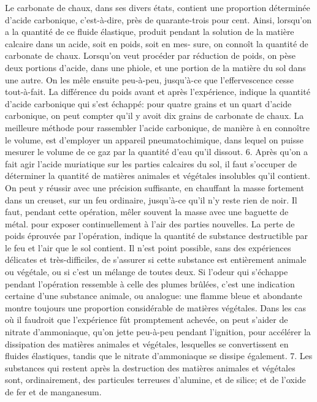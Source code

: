 Le carbonate de chaux, dans ses divers états, contient une proportion déterminée d'acide carbonique, c'est-à-dire, près de quarante-trois pour cent. Ainsi, lorsqu'on a la quantité de ce fluide élastique, produit pendant la solution de la matière calcaire dans un acide, soit en poids, soit en mes-\setcounter{page}{430} sure, on connoît la quantité de carbonate de chaux.
Lorsqu'on veut procéder par réduction de poids, on pèse deux portions d'acide, dans une phiole, et une portion de la matière du sol dans une autre. On les mêle ensuite peu-à-peu, jusqu'à-ce que l'effervescence cesse tout-à-fait. La différence du poids avant et après l'expérience, indique la quantité d'acide carbonique qui s'est échappé: pour quatre grains et un quart d'acide carbonique, on peut compter qu'il y avoit dix grains de carbonate de chaux. La meilleure méthode pour rassembler l'acide carbonique, de manière à en connoître le volume, est d'employer un appareil pneumatochimique, dans lequel on puisse mesurer le volume de ce gaz par la quantité d'eau qu'il dissout.
6. Après qu'on a fait agir l'acide muriatique sur les parties calcaires du sol, il faut s'occuper de déterminer la quantité de matières animales et végétales insolubles qu'il contient. On peut y réussir avec une précision suffisante, en chauffant la masse fortement dans un creuset, sur un feu ordinaire, jusqu'à-ce qu'il n'y reste rien de noir. Il faut, pendant cette opération, mêler souvent la masse avec une baguette de métal.\setcounter{page}{431} pour exposer continuellement à l'air des parties nouvelles. La perte de poids éprouvée par l'opération, indique la quantité de substance destructible par le feu et l'air que le sol contient.
Il n'est point possible, sans des expériences délicates et très-difficiles, de s'assurer si cette substance est entièrement animale ou végétale, ou si c'est un mélange de toutes deux. Si l'odeur qui s'échappe pendant l'opération ressemble à celle des plumes brûlées, c'est une indication certaine d'une substance animale, ou analogue: une flamme bleue et abondante montre toujours une proportion considérable de matières végétales. Dans les cas où il faudroit que l'expérience fût promptement achevée, on peut s'aider de nitrate d'ammoniaque, qu'on jette peu-à-peu pendant l'ignition, pour accélérer la dissipation des matières animales et végétales, lesquelles se convertissent en fluides élastiques, tandis que le nitrate d'ammoniaque se dissipe également.
7. Les substances qui restent après la destruction des matières animales et végétales sont, ordinairement, des particules terreuses d'alumine, et de silice; et de l'oxide de fer et de manganesum.
